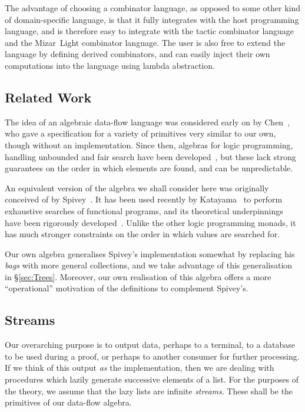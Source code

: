 The advantage of choosing a combinator language, as opposed to some other kind of domain-specific language, is that it fully integrates with the host programming language, and is therefore easy to integrate with the tactic combinator language and the Mizar~Light combinator language. The user is also free to extend the language by defining derived combinators, and can easily inject their own computations into the language using lambda abstraction.

\subsection{Related Work}
The idea of an algebraic data-flow language was considered early on by Chen~\cite{ChenForwardChaining}, who gave a specification for a variety of primitives very similar to our own, though without an implementation. Since then, algebras for logic programming, handling unbounded and fair search have been developed~\cite{BacktrackingMonad,Omega}, but these lack strong guarantees on the order in which elements are found, and can be unpredictable.

An equivalent version of the algebra we shall consider here was originally conceived of by Spivey~\cite{SpiveyBreadthFirst}. It has been used recently by Katayama~\cite{ImprovementsMagickHaskeller} to perform exhaustive searches of functional programs, and its theoretical underpinnings have been rigorously developed~\cite{SearchAlgebras}. Unlike the other logic programming monads, it has much stronger constraints on the order in which values are searched for. 

Our own algebra generalises Spivey's implementation somewhat by replacing his \emph{bags} with more general collections, and we take advantage of this generalisation in \S\ref{sec:Trees}. Moreover, our own realisation of this algebra offers a more ``operational'' motivation of the definitions to complement Spivey's.

\subsection{Streams}\label{sec:Streams}
Our overarching purpose is to output data, perhaps to a terminal, to a database to be used during a proof, or perhaps to another consumer for further processing. If we think of this output \emph{as} the implementation, then we are dealing with procedures which lazily generate successive elements of a list. For the purposes of the theory, we assume that the lazy lists are infinite \emph{streams}. These shall be the primitives of our data-flow algebra.

